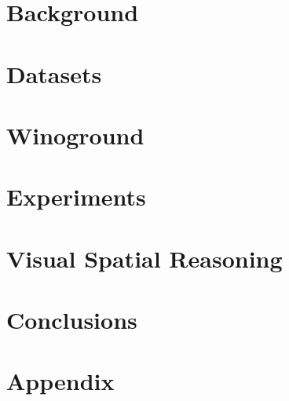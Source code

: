 \documentclass[a4paper, 11pt]{memoir}
\begin{document}
\chapter{Background} \label{cha:2_related_work}

\cleardoublepage

\chapter{Datasets} \label{cha:3_datasets}

\cleardoublepage

\chapter{Winoground} \label{cha:4_methods}

\cleardoublepage

\chapter{Experiments} \label{cha:5_experiments}

\cleardoublepage

\chapter{Visual Spatial Reasoning} \label{cha:6_visual_spatial_reasoning}

\cleardoublepage

\chapter{Conclusions} \label{cha:7_conclusions}

\cleardoublepage


\backmatter
\appendix

\chapter{Appendix} \label{cha:appendix}




\end{document}
